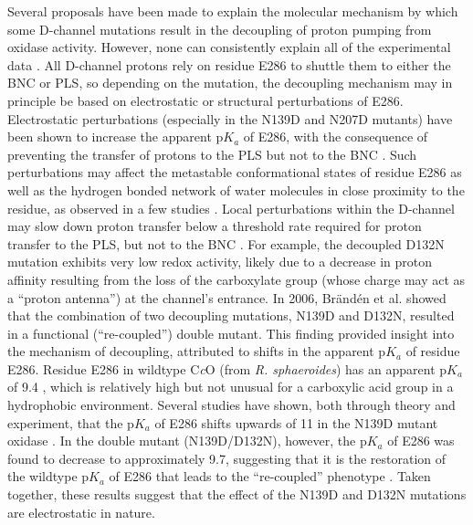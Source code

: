 Several proposals have been made to explain the molecular mechanism by which some D-channel mutations result in the decoupling of proton pumping from oxidase activity. However, none can consistently explain all of the experimental data \cite{Zhu:2010p8237}. All D-channel protons rely on residue E286 to shuttle them to either the BNC or PLS, so depending on the mutation, the decoupling mechanism may in principle be based on electrostatic or structural perturbations of E286. Electrostatic perturbations (especially in the N139D and N207D mutants) have been shown to increase the apparent p$K_a$ of E286, with the consequence of preventing the transfer of protons to the PLS but not to the BNC \cite{Namslauer:2003p6853,Han:2006p5624,Branden:2006p9874,Fadda:2008p5482,Lee:2010p8614}. Such perturbations may affect the metastable conformational states of residue E286 as well as the hydrogen bonded network of water molecules in close proximity to the residue, as observed in a few studies \cite{Vakkasoglu:2006p5432,Lepp:2008p5615,Durr:2008p6162,Zhu:2010p8237}. Local perturbations within the D-channel may slow down proton transfer below a threshold rate required for proton transfer to the PLS, but not to the BNC \cite{Mills:2000p4585,Henry:2009p4543,Zhu:2010p8237}. For example, the decoupled D132N mutation exhibits very low redox activity, likely due to a decrease in proton affinity resulting from the loss of the carboxylate group (whose charge may act as a ``proton antenna'') at the channel's entrance. In 2006, Brändén et al. \cite{Branden:2006p9874} showed that the combination of two decoupling mutations, N139D and D132N, resulted in a functional (``re-coupled'') double mutant. This finding provided insight into the mechanism of decoupling, attributed to shifts in the apparent p$K_a$ of residue E286. Residue E286 in wildtype C\emph{c}O (from \emph{R. sphaeroides}) has an apparent p$K_a$ of 9.4 \cite{Namslauer:2003p10505}, which is relatively high but not unusual for a carboxylic acid group in a hydrophobic environment. Several studies have shown, both through theory and experiment, that the p$K_a$ of E286 shifts upwards of 11 in the N139D mutant oxidase \cite{Branden:2006p9874,Fadda:2008p5482}. In the double mutant (N139D/D132N), however, the p$K_a$ of E286 was found to decrease to approximately 9.7, suggesting that it is the restoration of the wildtype p$K_a$ of E286 that leads to the ``re-coupled'' phenotype \cite{Branden:2006p9874}. Taken together, these results suggest that the effect of the N139D and D132N mutations are electrostatic in nature.

